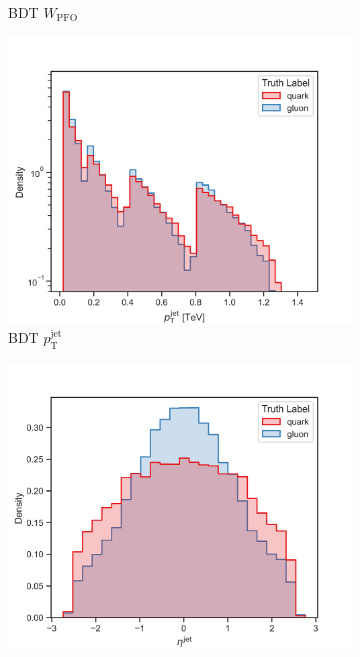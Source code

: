 \begin{figure}[!htb]
\begin{subfigure}[t]{0.49\textwidth}
        \caption{BDT $W_{\mathrm{PFO}}$}
        \label{fig:app_bdt_W_PFO}
    \end{subfigure}
    \begin{subfigure}[t]{0.49\textwidth}
        \includegraphics[width=\linewidth]{src/plots/distributions/BDT/pt_jet.png}
        \caption{BDT $p_{\mathrm{T}}^{\mathrm{jet}}$}
        \label{fig:app_bdt_pt_jet}
    \end{subfigure}
    \begin{subfigure}[t]{0.49\textwidth}
        \includegraphics[width=\linewidth]{src/plots/distributions/BDT/eta_jet.png}

\end{subfigure}
\end{figure}

